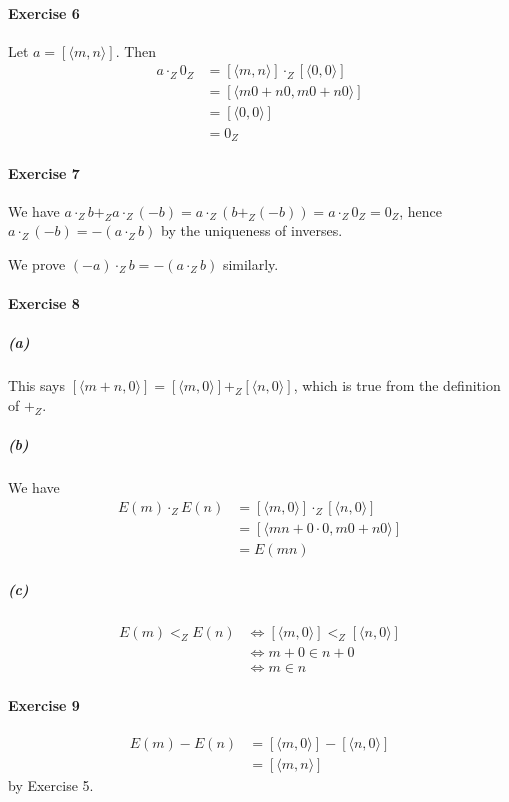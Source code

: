 \documentclass{report}
\begin{document}
    \paragraph{Exercise 6}
    Let $a = [\langle m,n \rangle]$. Then
    \begin{align*}
        a \cdot_Z 0_Z & = [\langle m,n \rangle] \cdot_Z [\langle 0,0 \rangle] \\
        & = [\langle m 0 + n 0, m 0 + n 0 \rangle] \\
        & = [\langle 0,0 \rangle] \\
        & = 0_Z
    \end{align*}

    \paragraph{Exercise 7}
    We have $a \cdot_Z b +_Z a \cdot_Z (-b) = a \cdot_Z (b +_Z (-b)) = a \cdot_Z 0_Z = 0_Z$,
    hence $a \cdot_Z (-b) = -(a \cdot_Z b)$ by the uniqueness of inverses.

    We prove $(-a) \cdot_Z b = -(a \cdot_Z b)$ similarly.

    \paragraph{Exercise 8}
    \subparagraph{(a)}
    This says $[\langle m + n, 0 \rangle] = [\langle m,0 \rangle] +_Z [\langle n,0 \rangle]$,
    which is true from the definition of $+_Z$.

    \subparagraph{(b)}
    We have
    \begin{align*}
        E(m) \cdot_Z E(n) & = [\langle m, 0 \rangle] \cdot_Z [\langle n,0 \rangle] \\
        & = [\langle mn + 0 \cdot 0, m0 + n0 \rangle] \\
        & = E(mn)
    \end{align*}

    \subparagraph{(c)}
    \begin{align*}
        E(m) <_Z E(n) & \Leftrightarrow [\langle m,0 \rangle] <_Z [\langle n,0 \rangle] \\
        & \Leftrightarrow m + 0 \in n + 0 \\
        & \Leftrightarrow m \in n
    \end{align*}

    \paragraph{Exercise 9}
    \begin{align*}
        E(m) - E(n) & = [\langle m,0 \rangle] - [\langle n, 0 \rangle] \\
        & = [\langle m, n \rangle]
    \end{align*}
    by Exercise 5.
\end{document}
